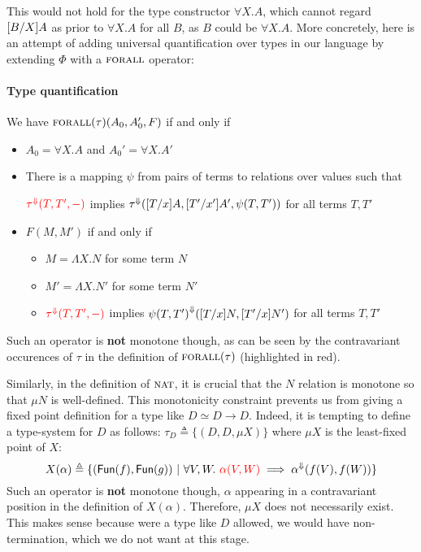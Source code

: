 \documentclass{article} \usepackage{chtt-notes} \usepackage{stmaryrd}
\newcommand{\lift}[1]{{#1}^{\Downarrow}}
\begin{document}
This would not hold for the type constructor $\forall X. A$, which
cannot regard $[B/X]A$ as prior to $\forall X. A$ for all
$B$, as $B$ could be $\forall X. A$. More concretely, here is an
attempt of adding universal quantification over types in our language
by extending $\Phi$ with a $\textsc{forall}$ operator:

\paragraph{Type quantification} 
We have $\textsc{forall}(\tau)(A_0, A'_0, F)$ if and only if
\begin{itemize}
\item $A_0 = \forall X. A$ and $A_0' = \forall X. A'$
\item There is a mapping $\psi$ from pairs of terms to relations over
  values such that
  \begin{center}
    $\color{red}{\lift{\tau}(T, T', -)}$ implies
    $\lift{\tau}(\subst{T}{x}{A}, \subst{T'}{x'}{A'}, \psi(T, T'))$ for all terms $T, T'$
  \end{center}
\item $F(M, M')$ if and only if
  \begin{itemize}
  \item $M = \Lambda X. N$ for some term $N$
  \item $M' = \Lambda X. N'$ for some term $N'$
  \item $\color{red}{\lift{\tau}(T, T', -)}$ implies
    $\lift{\psi(T, T')} (\subst{T}{x}{N}, \subst{T'}{x}{N'})$ for all
    terms $T, T'$
  \end{itemize}
\end{itemize}

Such an operator is \textbf{not} monotone though, as can be seen by
the contravariant occurences of $\tau$ in the definition of
$\textsc{forall}(\tau)$ (highlighted in red).

\bigskip

Similarly, in the definition of $\textsc{nat}$, it is crucial that the
$N$ relation is monotone so that $\mu N$ is well-defined.  This
monotonicity constraint prevents us from giving a fixed point
definition for a type like $D \simeq D \to D$. Indeed, it is tempting
to define a type-system for $D$ as follows:
$\tau_D \triangleq \{(D, D, \mu X)\}$ where $\mu X$ is the least-fixed
point of $X$:
\[ X(\alpha) \triangleq \{ (\textsf{Fun}(f), \textsf{Fun}(g)) \ | \
  \forall V, W. \ {\color{red}{\alpha(V, W)}} \implies
  \lift{\alpha}(f(V), f(W)) \} \] Such an operator is \textbf{not}
monotone though, $\alpha$ appearing in a contravariant position in the
definition of $X(\alpha)$. Therefore, $\mu X$ does not necessarily
exist. This makes sense because were a type like $D$ allowed, we would
have non-termination, which we do not want at this stage.


 
\end{document}
